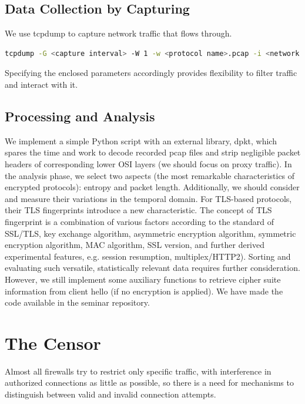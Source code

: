 \documentclass[conference]{IEEEtran}
\begin{document}
\subsection{Data Collection by Capturing}
We use tcpdump \cite{tcpdump} to capture network traffic that flows through.

\begin{lstlisting}[language=bash]
    tcpdump -G <capture interval> -W 1 -w <protocol name>.pcap -i <network interface> -n dst host <ip> and dst port <port> and <transmission protocol> --print
\end{lstlisting}

Specifying the enclosed parameters accordingly provides flexibility to filter traffic and interact with it.

\subsection{Processing and Analysis}
We implement a simple Python script with an external library, dpkt\cite{dpkt}, which spares the time and work to decode recorded pcap files and strip negligible packet headers of corresponding lower OSI layers (we should focus on proxy traffic).
In the analysis phase, we select two aspects (the most remarkable characteristics of encrypted protocols): entropy and packet length. Additionally, we should consider and measure their variations in the temporal domain.
For TLS-based protocols, their TLS fingerprints introduce a new characteristic. The concept of TLS fingerprint is a combination of various factors according to the standard of SSL/TLS, key exchange algorithm, asymmetric encryption algorithm, symmetric encryption algorithm, MAC algorithm, SSL version, and further derived experimental features, e.g. session resumption, multiplex/HTTP2).
Sorting and evaluating such versatile, statistically relevant data requires further consideration. However, we still implement some auxiliary functions to retrieve cipher suite information from client hello (if no encryption is applied).
We have made the code available in the seminar repository.

\section{The Censor}
Almost all firewalls try to restrict only specific traffic, with interference in authorized connections as little as possible, so there is a need for mechanisms to distinguish between valid and invalid connection attempts.
\end{document}

